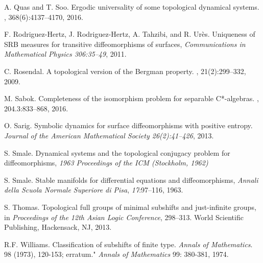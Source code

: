\documentclass{article}
\theoremstyle{definition}
\begin{document}
\begin{thebibliography}{99}
A. Quas and T. Soo.
\newblock Ergodic universality of some topological dynamical systems.
, 368(6):4137--4170, 2016.


F. Rodriguez-Hertz, J. Rodriguez-Hertz, A. Tahzibi, and R. Urès.  Uniqueness of SRB measures for transitive diffeomorphisms of surfaces, {\em Communications in Mathematical Physics 306:35–49}, 2011.

	
	C. Rosendal.
	\newblock A topological version of the {{Bergman}} property.
	, 21(2):299--332, 2009.

 M. Sabok.
\newblock Completeness of the isomorphism problem for separable C*-algebras. 
,
	204.3:833--868, 2016.
 
O. Sarig. Symbolic dynamics for surface diffeomorphisms with positive entropy. {\em Journal of the American Mathematical Society 26(2):41–426}, 2013.


 S. Smale. Dynamical systems and the topological conjugacy problem for diffeomorphisms, {\it 1963 Proceedings of the ICM (Stockholm, 1962)}

  S. Smale.  Stable manifolds for differential equations and diffeomorphisms, {\it  Annali della Scuola Normale Superiore di Pisa}, {\em17}:97--116, 1963.

S. Thomas. Topological full groups of minimal subshifts and just-infinite groups, in {\em Proceedings of the 12th Asian Logic Conference}, 298--313. World Scientific Publishing, Hackensack, NJ, 2013.




	
	
	


	
	R.F. Williams. Classification of subshifts of finite type.\textit{ Annals of Mathematics}. 98 (1973), 120-153; erratum." \textit{Annals of Mathematics} 99: 380-381, 1974.
	
\end{thebibliography}


%
%
\end{document}
